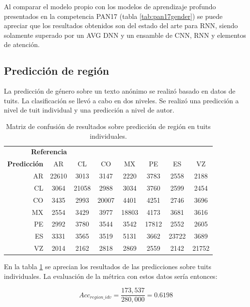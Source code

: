 Al comparar el modelo propio con los modelos de aprendizaje profundo presentados en la competencia PAN17 (tabla \ref{tab:pan17gender}) se puede apreciar que los resultados obtenidos son del estado del arte para RNN, siendo solamente superado por un AVG DNN y un ensamble de CNN, RNN y elementos de atención.

\subsection{Predicción de región}

La predicción de género sobre un texto anónimo se realizó basado en datos de tuits. La clasificación se llevó a cabo en dos niveles. Se realizó una predicción a nivel de tuit individual y una predicción a nivel de autor.

\begin{table}
\centering
\begin{tabular}{r | c c c c c c c}
\multicolumn{3}{c}{\textbf{Referencia}} \\
\textbf{Predicción} & AR & CL & CO & MX & PE & ES & VZ\\
\hline
AR & 22610 & 3013 & 3147 & 2220 & 3783 & 2558 & 2188 \\
CL & 3064 & 21058 & 2988 & 3034 & 3760 & 2599 & 2454 \\
CO & 3435 & 2993 & 20007 & 4401 & 4251 & 2746 & 3696 \\
MX & 2554 & 3429 & 3977 & 18803 & 4173 & 3681 & 3616 \\
PE & 2992 & 3780 & 3544 & 3542 & 17812 & 2552 & 2605 \\
ES & 3331 & 3565 & 3519 & 5131 & 3662 & 23722 & 3689 \\
VZ & 2014 & 2162 & 2818 & 2869 & 2559 & 2142 & 21752 \\
\end{tabular}
\caption{Matriz de confusión de resultados sobre predicción de región en tuits individuales.}
\label{tab:region_indvtweet}
\end{table}

En la tabla \ref{tab:region_indvtweet} se aprecian los resultados de las predicciones sobre tuits individuales. La evaluación de la métrica con estos datos sería entonces:

$$ Acc_{region\_idv} = \frac{173,537}{280,000} = 0\text{.}6198 $$

